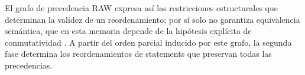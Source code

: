 El grafo de precedencia RAW expresa así las restricciones estructurales que determinan la validez de un reordenamiento; por sí solo no garantiza equivalencia semántica, que en esta memoria depende de la hipótesis explícita de conmutatividad \cite[secciones~5 y~9]{Kock2012}. A partir del orden parcial inducido por este grafo, la segunda fase determina los reordenamientos de statements que preservan todas las precedencias.
